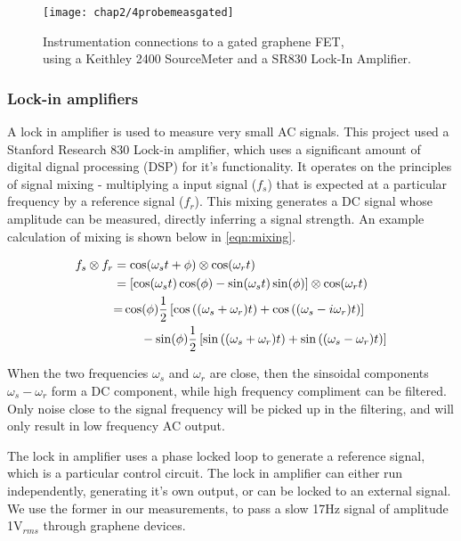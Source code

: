 \documentclass[../../Matt_Gebert_Honours_Thesis.tex]{subfiles}
\begin{document}
	\begin{figure}[H]
		\centering
		\texttt{[image: chap2/4probemeasgated]}
		\caption[Instrumentation connections to a gated graphene FET]{Instrumentation connections to a gated graphene FET,\\ using a Keithley 2400 SourceMeter and a SR830 Lock-In Amplifier.} \label{fig:instrumentation_device}
	\end{figure}
	
	\subsubsection{Lock-in amplifiers}
	A lock in amplifier is used to measure very small AC signals. This project used a Stanford Research 830 Lock-in amplifier\cite{sr830}, which uses a significant amount of digital dignal processing (DSP) for it's functionality. It operates on the principles of signal mixing - multiplying a input signal ($f_s$) that is expected at a particular frequency by a reference signal ($f_r$). This mixing generates a DC signal whose amplitude can be measured, directly inferring a signal strength. An example calculation of mixing is shown below in \cref{eqn:mixing}.
	
	\begin{align}
	f_{s}\otimes f_{r} &= \cos(\omega_{s} t + \phi) \otimes \cos(\omega_{r} t )\\
	&=	\left[\cos(\omega_{s} t)\cos(\phi) - \sin(\omega_{s}t)\sin(\phi)\right] \otimes \cos(\omega_{r} t )\nonumber\\
	&\begin{aligned}
		=&\cos(\phi)\frac{1}{2}\left[\cos\left(( \omega_s+  \omega_r)t\right) + \cos\left({( \omega_s - i \omega_r)t} \right)\right]\\
		&\hspace{0.5cm}-\sin(\phi)\frac{1}{2}\left[\sin\left((\omega_s + \omega_r)t\right)  + \sin\left((\omega_s - \omega_r)t\right)\right]
	\end{aligned}\label{eqn:mixing}
	\end{align}
	
	When the two frequencies $\omega_s$ and $\omega_r$ are close, then the sinsoidal components $\omega_s-\omega_r$ form a DC component, while high frequency compliment can be filtered. Only noise close to the signal frequency will be picked up in the filtering, and will only result in low frequency AC output. 
	
	The lock in amplifier uses a phase locked loop to generate a reference signal, which is a particular control circuit. The lock in amplifier can either run independently, generating it's own output, or can be locked to an external signal. We use the former in our measurements, to pass a slow 17Hz signal of amplitude 1V$_{rms}$ through graphene devices. 
	
\end{document}
